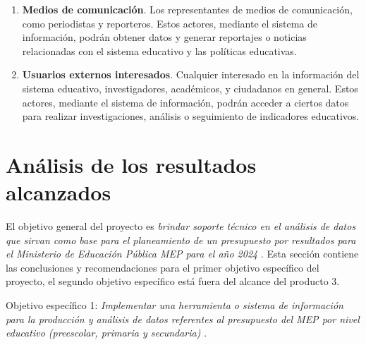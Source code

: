 \documentclass[9pt,a4paper]{IEEEtran}
\begin{document}
\begin{enumerate}
	\item \textbf{Medios de comunicaci\'on}. Los representantes de medios de comunicaci\'on, como periodistas y reporteros. Estos actores, mediante el sistema de informaci\'on, podr\'an obtener datos y generar reportajes o noticias relacionadas con el sistema educativo y las pol\'iticas educativas.

	\item \textbf{Usuarios externos interesados}. Cualquier interesado en la informaci\'on del sistema educativo, investigadores, acad\'emicos, y ciudadanos en general. Estos actores, mediante el sistema de informaci\'on, podr\'an acceder a ciertos datos para realizar investigaciones, an\'alisis o seguimiento de indicadores educativos.
\end{enumerate}

\section{An\'alisis de los resultados alcanzados}

El objetivo general del proyecto es \emph{brindar soporte t\'ecnico en el an\'alisis de datos que sirvan como base para el planeamiento de un presupuesto por resultados para el Ministerio de Educaci\'on P\'ublica MEP para el a\~no 2024} \cite{trd}. Esta secci\'on contiene las conclusiones y recomendaciones para el primer objetivo espec\'ifico del proyecto, el segundo objetivo espec\'ifico est\'a fuera del alcance del producto 3.

Objetivo espec\'ifico 1: \emph{Implementar una herramienta o sistema de informaci\'on para la producci\'on y an\'alisis de datos referentes al presupuesto del MEP por nivel educativo (preescolar, primaria y secundaria)} \cite{trd}.
\end{document}
